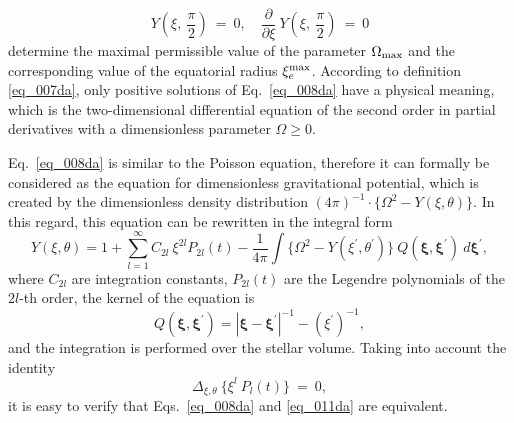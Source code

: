 \documentclass{caosp308}
\begin{document}
\begin{equation}
\label{eq_010da}
Y \left(\xi,\:\frac{\pi}{2}\right)\:=\:0, \quad \frac{\partial}{\partial\xi}\:Y \left(\xi,\:\frac{\pi}{2}\right)\:=\:0
\end{equation}
determine the maximal permissible value of the parameter $\Omega_{\rm max}$ and the corresponding value of the equatorial radius $\xi_e^{\rm max}$. According to definition \eqref{eq_007da}, only positive solutions of  Eq.~\eqref{eq_008da} have a physical meaning, which is the two-dimensional differential equation of the second order in partial derivatives with a dimensionless parameter $\Omega\geq 0$.

Eq.~\eqref{eq_008da} is similar to the Poisson equation, therefore it can formally be considered as the equation for dimensionless gravitational potential, which is created by the dimensionless density distribution $(4\pi)^{-1}\cdot\{\Omega^2 - Y (\xi,\theta)\}$.
In this regard, this equation can be rewritten in the integral form
\begin{equation}
\label{eq_011da}
Y (\xi,\theta) = 1+\sum\limits^{\infty}_{l=1} C_{2l}\:\xi^{2l} P_{2l}(t)-\frac{1}{4\pi}\int
\bigl\{\Omega^2-Y(\xi^{'},\theta^{'})\bigr\}\:Q ({\boldsymbol\xi},{\boldsymbol\xi}^{'})\:d{\boldsymbol\xi}^{'},
\end{equation}
where $C_{2l}$ are integration constants,  $P_{2l}(t)$ are the Legendre polynomials of the $2l$-th order, the kernel of the equation is
\begin{equation}
\label{eq_012da}
Q ({\boldsymbol\xi},{\boldsymbol\xi}^{'}) = |{\boldsymbol\xi}-{\boldsymbol\xi}^{'}|^{-1} - ({\xi}^{'})^{-1},
\end{equation}
and the integration is performed over the stellar volume. Taking into account the identity
\begin{equation}
\label{eq_013da}
\Delta_{\xi,\theta}\:\{\xi^l\:P_l (t) \}\:=\:0,
\end{equation}
it is easy to verify that Eqs.~\eqref{eq_008da} and \eqref{eq_011da} are equivalent.
\end{document}
